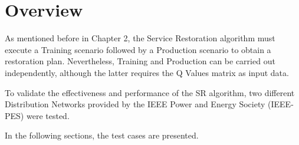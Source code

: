 \section{Overview}
\label{ch2:sec:overview}

As mentioned before in Chapter 2, the Service Restoration algorithm must execute a Training scenario followed by a Production scenario to obtain a restoration plan. Nevertheless, Training and Production can be carried out independently, although the latter requires the Q Values matrix as input data.

To validate the effectiveness and performance of the SR algorithm, two different Distribution Networks provided by the IEEE Power and Energy Society (IEEE-PES) were tested.

In the following sections, the test cases are presented. 